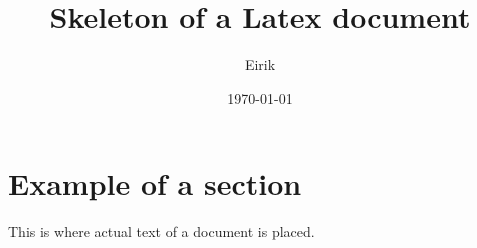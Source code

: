 \documentclass{article}
\title{Skeleton of a Latex document}
\author{Eirik}
\date{\today}
\begin{document}
\maketitle

\section{Example of a section}

This is where actual text of a document is placed. 
    
\end{document}
